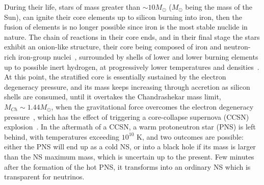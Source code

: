 During their life, stars of mass greater than {$\sim 10M_\odot$} 
($M_\odot$ being the mass of the Sun), can ignite their core elements up to 
silicon burning into iron, then the fusion of elements is 
no longer possible since iron is the most stable nuclide in nature. 
The chain of reactions in their core ends, and in their final stage the stars 
exhibit an onion-like structure, their core being composed of iron and 
neutron-rich iron-group nuclei~\cite{Bethe1979}, surrounded by shells of lower 
and lower burning elements up to possible inert hydrogen, at progressively 
lower temperatures and densities~\cite{Woosley2002}. 
At this point, the stratified core is essentially sustained by the electron
degeneracy pressure, and its mass keeps increasing through accretion as silicon 
shells are consumed, until it overtakes the Chandrashekar mass limit, $M_{Ch}
\sim 1.44M_\odot$, when the gravitational force overcomes the electron 
degeneracy pressure~\cite{Chandrasekhar1931}, which has the effect of 
triggering a core-collapse supernova (CCSN) explosion~\cite{Janka2007}.
In the aftermath of a CCSN, a warm protoneutron star (PNS) is left behind, with
temperatures exceeding $10^{10}$ K, and two outcomes are possible: either the 
PNS will end up {as a cold} NS, or into a black hole if its mass is 
larger than the NS maximum mass, which is uncertain up to the present. 
{Few minutes after the formation of the hot PNS, it transforms into 
  an ordinary NS which is transparent for neutrinos.}
 
